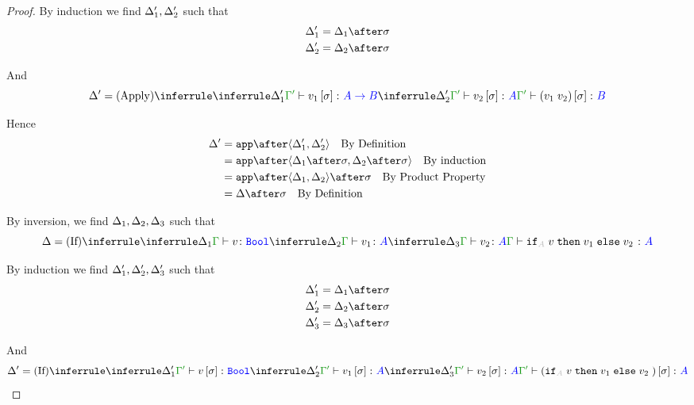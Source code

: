 \documentclass{report}
\begin{document}
\begin{framed}
\begin{proof}
        By induction we find $\Delta_1', \Delta_2'$ such that 
        \begin{align*}
            \D_1' &= \D_1\after\si\\
            \D_2' &= \D_2\after\si\\
        \end{align*}
        
        And
        \begin{equation}
            \D' = \ntreeruleII{Apply}{\treeruleI{\D_1'}{\typerelation{\G'}{v_1\ssi}{\ab}}}{\treeruleI{\D_2'}{\typerelation{\G'}{v_2\ssi}{A}}}{\typerelation{\G'}{(\apply{v_1}{v_2})\ssi}{B}}
        \end{equation}
        
        Hence
        \begin{align*}
            \D' &= \app\after\pr{\D_1'}{\D_2'}\qt{By Definition}\\
                &= \app\after\pr{\D_1\after\si}{\D_2\after\si}\qt{By induction}\\
                &= \app\after\pr{\D_1}{\D_2}\after\si\qt{By Product Property}\\
                & = \D\after\si\qt{By Definition}\\
        \end{align*}
        
        
        
        By inversion, we find $\Delta_1, \Delta_2, \Delta_3$ such that
        \begin{equation}
            \D = \ntreeruleIII{If}{\treeruleI{\D_1}{\typerelation{\G}{v}{\B}}}{\treeruleI{\D_2}{\typerelation{\G}{v_1}{ A}}}{\treeruleI{\D_3}{\typerelation{\G}{v_2}{ A}}}{\typerelation{\G}{\pifthenelse{A}{v}{v_1}{v_2}}{ A}}
        \end{equation}
        
        By induction we find $\Delta_1', \Delta_2', \Delta_3'$ such that 
        \begin{align*}
            \D_1' &= \D_1\after\si\\
            \D_2' &= \D_2\after\si\\
            \D_3' &= \D_3\after\si\\
        \end{align*}
        
        And
        \begin{equation}
            \D' = \ntreeruleIII{If}{\treeruleI{\D_1'}{\typerelation{\G'}{v\ssi}{\B}}}{\treeruleI{\D_2'}{\typerelation{\G'}{v_1\ssi}{ A}}}{\treeruleI{\D_3'}{\typerelation{\G'}{v_2\ssi}{ A}}}{\typerelation{\G'}{(\pifthenelse{A}{v}{v_1}{v_2})\ssi}{ A}}
        \end{equation}
        

\end{proof}
\end{framed}
\end{document}
